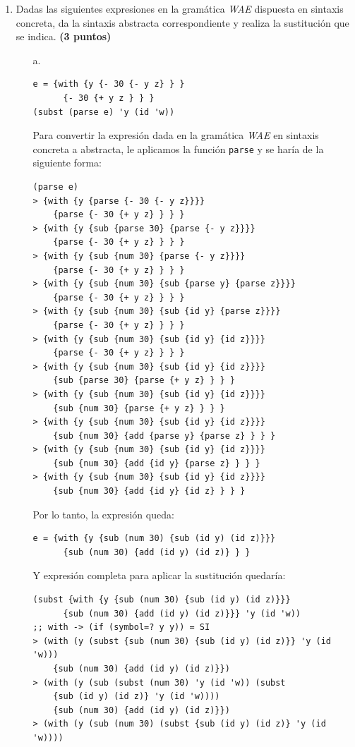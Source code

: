 \documentclass[11pt]{article}
\begin{document}
\begin{enumerate}[leftmargin=0.8cm]
    \item Dadas las siguientes expresiones en la gramática \textit{WAE} dispuesta en sintaxis concreta, da la sintaxis abstracta correspondiente y realiza la sustitución que se indica. \textbf{(3 puntos)}
    \begin{enumerate}
        \item[a.] \begin{lstlisting}
e = {with {y {- 30 {- y z} } }
      {- 30 {+ y z } } }
(subst (parse e) 'y (id 'w))
        \end{lstlisting}
        Para convertir la expresión dada en la gramática \textit{WAE} en sintaxis concreta a abstracta, le aplicamos la función \texttt{parse} y se haría de la siguiente forma:
        \begin{lstlisting}
(parse e)
> {with {y {parse {- 30 {- y z}}}}
    {parse {- 30 {+ y z} } } }
> {with {y {sub {parse 30} {parse {- y z}}}}
    {parse {- 30 {+ y z} } } }
> {with {y {sub {num 30} {parse {- y z}}}}
    {parse {- 30 {+ y z} } } }
> {with {y {sub {num 30} {sub {parse y} {parse z}}}}
    {parse {- 30 {+ y z} } } }
> {with {y {sub {num 30} {sub {id y} {parse z}}}}
    {parse {- 30 {+ y z} } } }
> {with {y {sub {num 30} {sub {id y} {id z}}}}
    {parse {- 30 {+ y z} } } }
> {with {y {sub {num 30} {sub {id y} {id z}}}}
    {sub {parse 30} {parse {+ y z} } } }
> {with {y {sub {num 30} {sub {id y} {id z}}}}
    {sub {num 30} {parse {+ y z} } } }
> {with {y {sub {num 30} {sub {id y} {id z}}}}
    {sub {num 30} {add {parse y} {parse z} } } }
> {with {y {sub {num 30} {sub {id y} {id z}}}}
    {sub {num 30} {add {id y} {parse z} } } }
> {with {y {sub {num 30} {sub {id y} {id z}}}}
    {sub {num 30} {add {id y} {id z} } } }
        \end{lstlisting}
        Por lo tanto, la expresión queda:
        \begin{lstlisting}
e = {with {y {sub (num 30) {sub (id y) (id z)}}}
      {sub (num 30) {add (id y) (id z)} } }
        \end{lstlisting}
        Y expresión completa para aplicar la sustitución quedaría:
        \begin{lstlisting}
(subst {with {y {sub (num 30) {sub (id y) (id z)}}}
      {sub (num 30) {add (id y) (id z)}}} 'y (id 'w))
;; with -> (if (symbol=? y y)) = SI
> (with (y (subst {sub (num 30) {sub (id y) (id z)}} 'y (id 'w)))
    {sub (num 30) {add (id y) (id z)}})
> (with (y (sub (subst (num 30) 'y (id 'w)) (subst
    {sub (id y) (id z)} 'y (id 'w))))
    {sub (num 30) {add (id y) (id z)}})
> (with (y (sub (num 30) (subst {sub (id y) (id z)} 'y (id 'w))))

\end{lstlisting}
\end{enumerate}
\end{enumerate}
\end{document}
